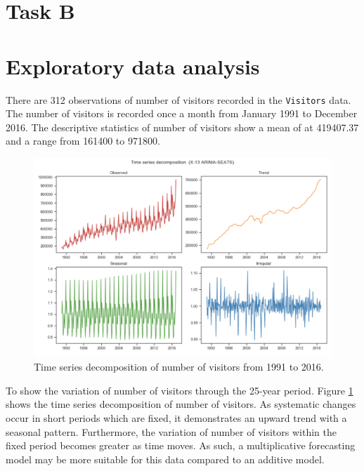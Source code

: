 \documentclass[letterpaper,12pt,twoside,]{pinp}
\begin{document}
\newpage

\hypertarget{task-b}{%
\section{Task B}\label{task-b}}

\hypertarget{exploratory-data-analysis}{%
\section{Exploratory data analysis}\label{exploratory-data-analysis}}

There are 312 observations of number of visitors recorded in the
\texttt{Visitors} data. The number of visitors is recorded once a month
from January 1991 to December 2016. The descriptive statistics of number
of visitors show a mean of at 419407.37 and a range from 161400 to
971800.

\begin{figure}
\includegraphics[width=1\linewidth]{decomposition.png}
\centering
\caption{Time series decomposition of number of visitors from 1991 to 2016.}
\label{fig:timeseries}
\end{figure}

To show the variation of number of visitors through the 25-year period.
Figure \ref{fig:timeseries} shows the time series decomposition of
number of visitors. As systematic changes occur in short periods which
are fixed, it demonstrates an upward trend with a seasonal pattern.
Furthermore, the variation of number of visitors within the fixed period
becomes greater as time moves. As such, a multiplicative forecasting
model may be more suitable for this data compared to an additive model.
\end{document}
